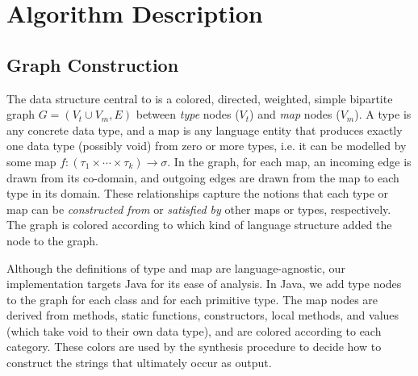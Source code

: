 \section{Algorithm Description}
\subsection{Graph Construction}

The data structure central to \ourTool is a colored, directed, weighted, simple bipartite graph $G = (V_t \cup V_m, E)$ between \textit{type} nodes ($V_t$) and \textit{map} nodes ($V_m$). A type is any concrete data type, and a map is any language entity that produces exactly one data type (possibly void) from zero or more types, i.e. it can be modelled by some map $f : (\tau_1 \times \cdots \times \tau_k) \to \sigma$. In the graph, for each map, an incoming edge is drawn from its co-domain, and outgoing edges are drawn from the map to each type in its domain. These relationships capture the notions that each type or map can be \textit{constructed from} or \textit{satisfied by} other maps or types, respectively. The graph is colored according to which kind of language structure added the node to the graph.

Although the definitions of type and map are language-agnostic, our implementation targets Java for its ease of analysis. In Java, we add type nodes to the graph for each class and for each primitive type. The map nodes are derived from methods, static functions, constructors, local methods, and values (which take void to their own data type), and are colored according to each category. These colors are used by the synthesis procedure to decide how to construct the strings that ultimately occur as output.
